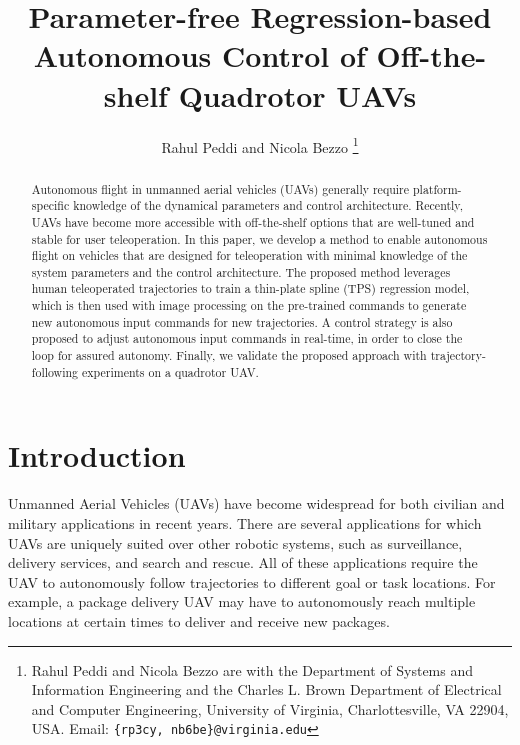 \documentclass[letterpaper, 10 pt, conference]{ieeeconf}  %
\newcommand\NB[1]{$\spadesuit$\footnote{NB: #1}}
\begin{document}
\title{\LARGE \bf
Parameter-free Regression-based Autonomous Control of Off-the-shelf Quadrotor UAVs
}


\author{Rahul Peddi and Nicola Bezzo%
\thanks{Rahul Peddi and Nicola Bezzo are with the Department of Systems and Information Engineering and the Charles L. Brown Department of Electrical and Computer Engineering, University of Virginia, Charlottesville, VA 22904, USA. Email: {\tt \{rp3cy, nb6be\}@virginia.edu}}}



\maketitle
\thispagestyle{empty}
\pagestyle{empty}


\begin{abstract}
Autonomous flight in unmanned aerial vehicles (UAVs) generally require platform-specific knowledge of the dynamical parameters and control architecture. Recently, UAVs have become more accessible with off-the-shelf options that are well-tuned and stable for user teleoperation. In this paper, we develop a method to enable autonomous flight on vehicles that are designed for teleoperation with minimal knowledge of the system parameters and the control architecture. The proposed method leverages human teleoperated trajectories to train a thin-plate spline (TPS) regression model, which is then used with image processing on the pre-trained commands to generate new autonomous input commands for new trajectories. A control strategy is also proposed to adjust autonomous input commands in real-time, in order to close the loop for assured autonomy. Finally, we validate the proposed approach with trajectory-following experiments on a quadrotor UAV.

\end{abstract}


\section{Introduction}
Unmanned Aerial Vehicles (UAVs) have become widespread for both civilian and military applications in recent years. There are several applications for which UAVs are uniquely suited over other robotic systems, such as surveillance, delivery services, and search and rescue. All of these applications require the UAV to autonomously follow trajectories to different goal or task locations. For example, a package delivery UAV may have to autonomously reach multiple locations at certain times to deliver and receive new packages. 
\end{document}

